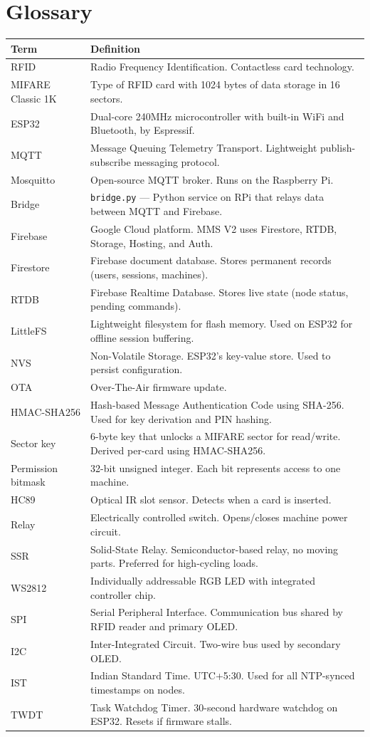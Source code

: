 \section{Glossary}

\begin{longtable}{L{3.5cm}L{10cm}}
\toprule
\textbf{Term} & \textbf{Definition} \\
\midrule
\endhead
RFID & Radio Frequency Identification. Contactless card technology. \\
MIFARE Classic 1K & Type of RFID card with 1024 bytes of data storage in 16 sectors. \\
ESP32 & Dual-core 240MHz microcontroller with built-in WiFi and Bluetooth, by Espressif. \\
MQTT & Message Queuing Telemetry Transport. Lightweight publish-subscribe messaging protocol. \\
Mosquitto & Open-source MQTT broker. Runs on the Raspberry Pi. \\
Bridge & \texttt{bridge.py} — Python service on RPi that relays data between MQTT and Firebase. \\
Firebase & Google Cloud platform. MMS V2 uses Firestore, RTDB, Storage, Hosting, and Auth. \\
Firestore & Firebase document database. Stores permanent records (users, sessions, machines). \\
RTDB & Firebase Realtime Database. Stores live state (node status, pending commands). \\
LittleFS & Lightweight filesystem for flash memory. Used on ESP32 for offline session buffering. \\
NVS & Non-Volatile Storage. ESP32's key-value store. Used to persist configuration. \\
OTA & Over-The-Air firmware update. \\
HMAC-SHA256 & Hash-based Message Authentication Code using SHA-256. Used for key derivation and PIN hashing. \\
Sector key & 6-byte key that unlocks a MIFARE sector for read/write. Derived per-card using HMAC-SHA256. \\
Permission bitmask & 32-bit unsigned integer. Each bit represents access to one machine. \\
HC89 & Optical IR slot sensor. Detects when a card is inserted. \\
Relay & Electrically controlled switch. Opens/closes machine power circuit. \\
SSR & Solid-State Relay. Semiconductor-based relay, no moving parts. Preferred for high-cycling loads. \\
WS2812 & Individually addressable RGB LED with integrated controller chip. \\
SPI & Serial Peripheral Interface. Communication bus shared by RFID reader and primary OLED. \\
I2C & Inter-Integrated Circuit. Two-wire bus used by secondary OLED. \\
IST & Indian Standard Time. UTC+5:30. Used for all NTP-synced timestamps on nodes. \\
TWDT & Task Watchdog Timer. 30-second hardware watchdog on ESP32. Resets if firmware stalls. \\
\bottomrule
\end{longtable}
